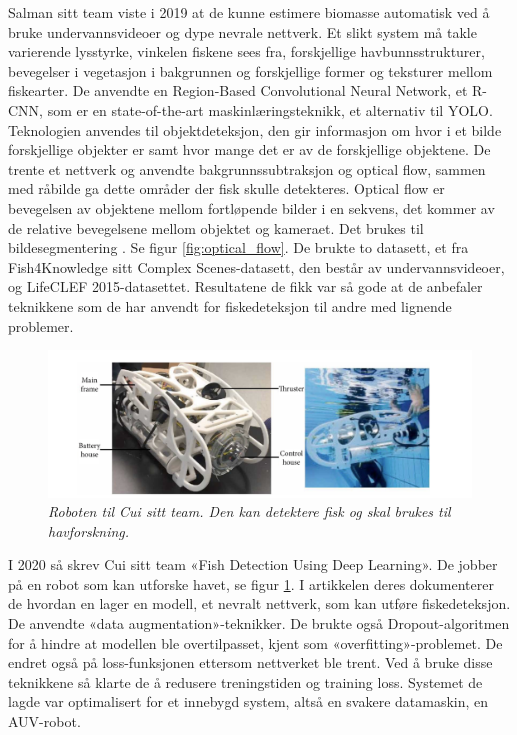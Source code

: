 Salman sitt team viste i 2019 at de kunne estimere biomasse automatisk ved å bruke undervannsvideoer og dype nevrale nettverk.  Et slikt system må takle varierende lysstyrke, vinkelen fiskene sees fra, forskjellige havbunnsstrukturer, bevegelser i vegetasjon i bakgrunnen og forskjellige former og teksturer mellom fiskearter. De anvendte en Region-Based Convolutional Neural Network, et R-CNN, som er en state-of-the-art maskinlæringsteknikk, et alternativ til YOLO. Teknologien anvendes til objektdeteksjon, den gir informasjon om hvor i et bilde forskjellige objekter er samt hvor mange det er av de forskjellige objektene. De trente et nettverk og anvendte bakgrunnssubtraksjon og optical flow, sammen med råbilde ga dette områder der fisk skulle detekteres. Optical flow er bevegelsen av objektene mellom fortløpende bilder i en sekvens, det kommer av de relative bevegelsene mellom objektet og kameraet. Det brukes til bildesegmentering \cite{Lin 2019}. Se figur \ref{fig:optical_flow}. De brukte to datasett, et fra Fish4Knowledge sitt Complex Scenes-datasett, den består av undervannsvideoer, og LifeCLEF 2015-datasettet. Resultatene de fikk var så gode at de anbefaler teknikkene som de har anvendt for fiskedeteksjon til andre med lignende problemer. \cite{Salman m.fl. 2019}

\begin{figure}
\begin{center} 
\includegraphics[scale=0.45]{figures/auv}
\caption{\small \sl Roboten til Cui sitt team. Den kan detektere fisk og skal brukes til havforskning. \cite{Cui m.fl. 2020} \label{fig:auv}} 
\end{center} 
\end{figure} 

I 2020 så skrev Cui sitt team «Fish Detection Using Deep Learning». De jobber på en robot som kan utforske havet, se figur \ref{fig:auv}. I artikkelen deres dokumenterer de hvordan en lager en modell, et nevralt nettverk, som kan utføre fiskedeteksjon. De anvendte «data augmentation»-teknikker. De brukte også Dropout-algoritmen for å hindre at modellen ble overtilpasset, kjent som «overfitting»-problemet. De endret også på loss-funksjonen ettersom nettverket ble trent. Ved å bruke disse teknikkene så klarte de å redusere treningstiden og training loss. Systemet de lagde var optimalisert for et innebygd system, altså en svakere datamaskin, en AUV-robot. \cite{Cui m.fl. 2020}

